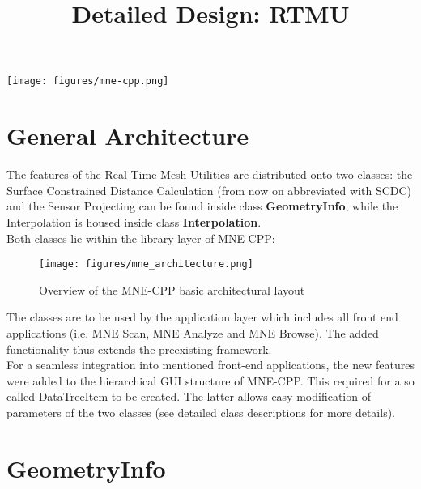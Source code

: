 





	
\title{Detailed Design: RTMU}
\vspace{3 in}
\maketitle

\texttt{[image: figures/mne-cpp.png]}

\clearpage


\tableofcontents

\clearpage
\section{General Architecture}
The features of the Real-Time Mesh Utilities are distributed onto two classes: the Surface Constrained Distance Calculation (from now on abbreviated with SCDC) and the Sensor Projecting can be found inside class \textbf{GeometryInfo}, while the Interpolation is housed inside class \textbf{Interpolation}.\\
Both classes lie within the library layer of MNE-CPP:

\begin{figure}[h]
	\begin{center}
		\texttt{[image: figures/mne\_architecture.png]}
		\caption{Overview of the MNE-CPP basic architectural layout}
	\end{center}
\end{figure}

The classes are to be used by the application layer which includes all front end applications (i.e. MNE Scan, MNE Analyze and MNE Browse).
The added functionality thus extends the preexisting framework.\\
For a seamless integration into mentioned front-end applications, the new features were added to the hierarchical GUI structure of MNE-CPP. This required for a so called DataTreeItem to be created. The latter allows easy modification of parameters of the two classes (see detailed class descriptions for more details).


\clearpage

\section{GeometryInfo}


